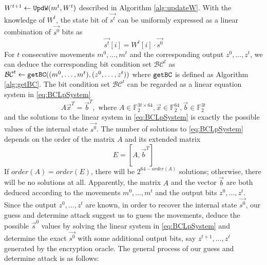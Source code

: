 $W^{t+1}\leftarrow {\tt UpdW}(m^t, W^t)$ described in Algorithm \ref{alg:updateW}.
With the knowledge of $W^t$, the state bit of $\vec{s^t}$ can be uniformly expressed as a linear combination of $\vec{s^0}$ bits as
\begin{equation}\label{eq:ExpressStwithS0}
\vec{s^t}[i]=W^t[i]\cdot \vec{s^0}
\end{equation}
For $t$ consecutive movements $m^0,\ldots,m^t$ and the corresponding output $z^0,\ldots, z^t$, we can deduce the corresponding bit condition set $\mathcal{BC}^t$ as $\mathcal{BC}^t\leftarrow {\tt{getBC}}((m^0,\ldots, m^t), (z^0,\ldots, z^t))$ where ${\tt{getBC}}$ is defined as Algorithm \ref{alg:getBC}.
The bit condition set $\mathcal{BC}^t$ can be regarded as a linear equation system in \eqref{eq:BCLpSystem}
\begin{equation}\label{eq:BCLpSystem}
  A\vec x^T=\vec b^T, \text{ where } A\in \mathbb{F}_2^{3t\times 64}, \vec x\in \mathbb{F}_2^{64}, \vec b\in \mathbb{F}_2^{3t}
\end{equation}
and the solutions to the linear system in \eqref{eq:BCLpSystem} is exactly the possible values of the internal state $\vec{s^0}$.
The number of solutions to \eqref{eq:BCLpSystem} depends on the order of the matrix $A$ and its extended matrix
\begin{equation}\label{eq:ExtendedMatrixOfA}
  E=[A,\vec b^T]
\end{equation}
If $order(A)=order(E)$, there will be $2^{64-order(A)}$ solutions; otherwise, there will be no solutions at all.
Apparently, the matrix $A$ and the vector $\vec b$ are both deduced according to the movements $m^0,\ldots, m^t$ and the output bits $z^0,\ldots, z^t$.
Since the output $z^0,\ldots, z^t$ are known, in order to recover the internal state $\vec{s^0}$, our guess and determine attack suggest us to guess the movements, deduce the possible $\vec s^0$ values by solving the linear system in \eqref{eq:BCLpSystem} and determine the exact $\vec{s^0}$ with some additional output bits, say $z^{t+1},\ldots, z^{\ell}$ generated by the encryption oracle.
The general process of our guess and determine attack is as follows:
